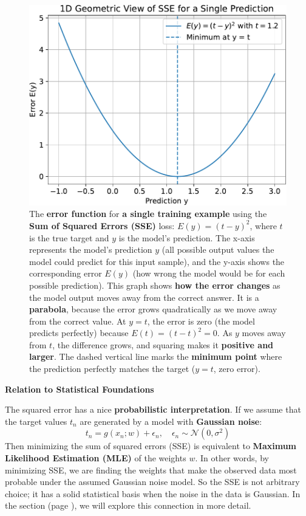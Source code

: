 \begin{figure}[!htp]
    \centering
    \includegraphics[width=.85\textwidth]{img/learning-and-optimization/error-geometric-interpretation-2.pdf}
    \caption{The \textbf{error function} for \textbf{a single training example} using the \textbf{Sum of Squared Errors (SSE)} loss: $E(y) = \left(t-y\right)^{2}$, where $t$ is the true target and $y$ is the model's prediction. The x-axis represents the model's prediction $y$ (all possible output values the model could predict for this input sample), and the y-axis shows the corresponding error $E(y)$ (how wrong the model would be for each possible prediction). This graph shows \textbf{how the error changes} as the model output moves away from the correct answer. It is a \textbf{parabola}, because the error grows quadratically as we move away from the correct value. At $y = t$, the error is zero (the model predicts perfectly) because $E(t) = (t - t)^2 = 0$. As $y$ moves away from $t$, the difference grows, and squaring makes it \textbf{positive and larger}. The dashed vertical line marks the \textbf{minimum point} where the prediction perfectly matches the target ($y = t$, zero error).}
\end{figure}

\begin{flushleft}
    \textcolor{Green3}{ \textbf{Relation to Statistical Foundations}}
\end{flushleft}
The squared error has a nice \textbf{probabilistic interpretation}. If we assume that the target values $t_{n}$ are generated by a model with \textbf{Gaussian noise}:
\begin{equation*}
    t_{n} = g(x_{n}; w) + \epsilon_{n}, \quad \epsilon_{n} \sim \mathcal{N}(0, \sigma^{2})
\end{equation*}
Then minimizing the sum of squared errors (SSE) is equivalent to \textbf{Maximum Likelihood Estimation (MLE)} of the weights $w$. In other words, by minimizing SSE, we are finding the weights that make the observed data most probable under the assumed Gaussian noise model. So the SSE is not arbitrary choice; it has a solid statistical basis when the noise in the data is Gaussian. In the section  (page \pageref{sec:maximum-likelihood-estimation}), we will explore this connection in more detail.